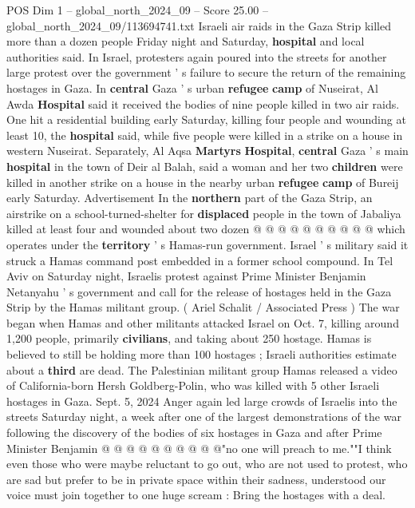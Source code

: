 \begin{textsample}{POS Dim 1 – global\_north\_2024\_09 – Score 25.00 – global\_north\_2024\_09/113694741.txt}  \label{ex:f1_pos_425}
Israeli air raids in the Gaza Strip killed more than a dozen people Friday night and Saturday, \textbf{hospital} and local authorities said.
In Israel, protesters again poured into the streets for another large protest over the government ' s failure to secure the return of the remaining hostages in Gaza.
In \textbf{central} Gaza ' s urban \textbf{refugee} \textbf{camp} of Nuseirat, Al Awda \textbf{Hospital} said it received the bodies of nine people killed in two air raids.
One hit a residential building early Saturday, killing four people and wounding at least 10, the \textbf{hospital} said, while five people were killed in a strike on a house in western Nuseirat.
Separately, Al Aqsa \textbf{Martyrs} \textbf{Hospital}, \textbf{central} Gaza ' s main \textbf{hospital} in the town of Deir al Balah, said a woman and her two \textbf{children} were killed in another strike on a house in the nearby urban \textbf{refugee} \textbf{camp} of Bureij early Saturday.
Advertisement In the \textbf{northern} part of the Gaza Strip, an airstrike on a school-turned-shelter for \textbf{displaced} people in the town of Jabaliya killed at least four and wounded about two dozen @ @ @ @ @ @ @ @ @ @ which operates under the \textbf{territory} ' s Hamas-run government.
Israel ' s military said it struck a Hamas command post embedded in a former school compound.
In Tel Aviv on Saturday night, Israelis protest against Prime Minister Benjamin Netanyahu ' s government and call for the release of hostages held in the Gaza Strip by the Hamas militant group. ( Ariel Schalit / Associated Press ) The war began when Hamas and other militants attacked Israel on Oct. 7, killing around 1,200 people, primarily \textbf{civilians}, and taking about 250 hostage.
Hamas is believed to still be holding more than 100 hostages ; Israeli authorities estimate about a \textbf{third} are dead.
The Palestinian militant group Hamas released a video of California-born Hersh Goldberg-Polin, who was killed with 5 other Israeli hostages in Gaza.
Sept. 5, 2024 Anger again led large crowds of Israelis into the streets Saturday night, a week after one of the largest demonstrations of the war following the discovery of the bodies of six hostages in Gaza and after Prime Minister Benjamin @ @ @ @ @ @ @ @ @ @"no one will preach to me.""I think even those who were maybe reluctant to go out, who are not used to protest, who are sad but prefer to be in private space within their sadness, understood our voice must join together to one huge scream : Bring the hostages with a deal.

\end{textsample}
